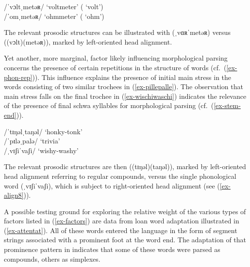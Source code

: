 \documentclass[output=paper
 ,nobabel
 ,draftmode
 ,colorlinks, citecolor=brown
]{langscibook}
\begin{document}
\ex\label{ex-voltmeter}
/ˈvɔltˌmetəʀ/  `voltmeter' ( `volt')  \\ 
/ˈomˌmetəʀ/  `ohmmeter' ( `ohm')  \\ 

\zl

\noindent
The relevant prosodic structures can be illustrated with (ˌvɑʀˈmetəʀ) versus ((vɔlt)(metəʀ)), marked by left-oriented head alignment.

Yet another, more marginal, factor likely influencing morphological parsing concerns the presence of certain repetitions in the structure of words (cf.\ (\ref{ex-phon-rep})). This influence explains the presence of initial main stress in the words consisting of two similar trochees in (\ref{ex-pillepalle}). The observation that main stress falls on the final trochee in (\ref{ex-wischiwaschi}) indicates the relevance of the presence of final schwa syllables for morphological parsing (cf.\ (\ref{ex-stem-end})).


\eal\label{ex-Pille-Waschi}
\ex\label{ex-pillepalle}
/ˈtɪŋəlˌtaŋəl/  `honky-tonk'  \\ 
/ˈpɪləˌpalə/  `trivia'  \\ 

\ex\label{ex-wischiwaschi}
/ˌvɪʃiˈvaʃi/  `wishy-washy'   \\ 

\zl

\noindent
The relevant prosodic structures are then ((tɪŋəl)(taŋəl)), marked by left-oriented head alignment referring to regular compounds, versus the single phonological word (ˌvɪʃiˈvaʃi), which is subject to right-oriented head alignment (see (\ref{ex-align8})).

\largerpage
A possible testing ground for exploring the relative weight of the various types of factors listed
in (\ref{ex-factors}) are data from loan word adaptation illustrated in (\ref{ex-attentat}). All of
these words entered the language in the form of segment strings associated with a prominent foot at
the word end. The adaptation of that prominence pattern in  indicates that some of these words
were parsed as compounds, others as simplexes. 


\ea\label{ex-attentat}
\end{document}
